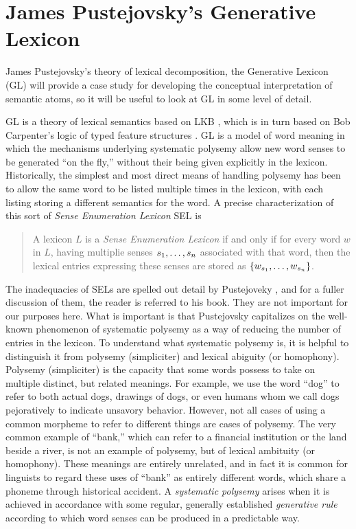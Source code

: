 \section{James Pustejovsky's Generative Lexicon}\label{GL}

James Pustejovsky's theory of lexical decomposition, the Generative Lexicon (GL) \cite{pustejovsky_generative_1998} will provide a case study for developing the conceptual interpretation of semantic atoms, so it will be useful to look at GL in some level of detail.

GL is a theory of lexical semantics based on LKB \cite{sanfillipo_lkb_1993}, which is in turn based on Bob Carpenter's logic of typed feature structures \cite{carpenter_logic_1992}. GL is a model of word meaning in which the mechanisms underlying systematic polysemy allow new word senses to be generated ``on the fly,'' without their being given explicitly in the lexicon. Historically, the simplest and most direct means of handling polysemy has been to allow the same word to be listed multiple times in the lexicon, with each listing storing a different semantics for the word. A precise characterization of this sort of \emph{Sense Enumeration Lexicon} SEL is
\begin{quote}
A lexicon $L$ is a \emph{Sense Enumeration Lexicon} if and only if for every word $w$ in $L$, having multiplie senses $s_1,\mathellipsis,s_n$ associated with that word, then the lexical entries expressing these senses are stored as $\{w_{s_1},\mathellipsis,w_{s_n}\}$. \cite[p. 34]{pustejovsky_generative_1998}
\end{quote}

The inadequacies of SELs are spelled out detail by Pustejoveky \cite[Ch.\ 4]{pustejovsky_generative_1998}, and for a fuller discussion of them, the reader is referred to his book. They are not important for our purposes here. What is important is that Pustejovsky capitalizes on the well-known phenomenon of systematic polysemy as a way of reducing the number of entries in the lexicon. To understand what systematic polysemy is, it is helpful to distinguish it from polysemy (simpliciter) and lexical abiguity (or homophony). Polysemy (simpliciter) is the capacity that some words possess to take on multiple distinct, but related meanings. For example, we use the word ``dog'' to refer to both actual dogs, drawings of dogs, or even humans whom we call dogs pejoratively to indicate unsavory behavior. However, not all cases of using a common morpheme to refer to different things are cases of polysemy. The very common example of ``bank,'' which can refer to a financial institution or the land beside a river, is not an example of polysemy, but of lexical ambituity (or homophony). These meanings are entirely unrelated, and in fact it is common for linguists to regard these uses of ``bank'' as entirely different words, which share a phoneme through historical accident. A \emph{systematic polysemy} arises when it is achieved in accordance with some regular, generally established \emph{generative rule} according to which word senses can be produced in a predictable way.


